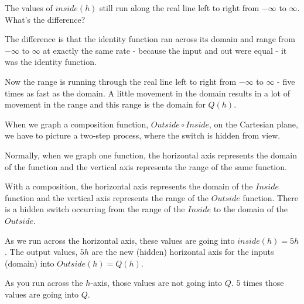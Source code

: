 \documentclass{ximera}
\begin{document}
The values of $inside(h)$ still run along the real line left to right from $-\infty$ to $\infty$. What's the difference?

The difference is that the identity function ran across its domain and range from $-\infty$ to $\infty$ at exactly the same rate - because the input and out were equal - it was the identity function.


Now the range is running through the real line left to right from $-\infty$ to $\infty$ - five times as fast as the domain. A little movement in the domain results in a lot of movement in the range and this range is the domain for $Q(h)$.






\begin{paradox}

When we graph a composition function, $Outside \circ Inside$, on the Cartesian plane, we have to picture a two-step process, where the switch is hidden from view.  

Normally, when we graph one function, the horizontal axis represents the domain of the function and the vertical axis represents the range of the same function.

With a composition, the horizontal axis represents the domain of the $Inside$ function and the vertical axis represents the range of the $Outside$ function.  There is a hidden switch occurring from the range of the $Inside$ to the domain of the $Outside$.

\end{paradox}

As we run across the horizontal axis, these values are going into $inside(h) = 5h$.  The output values, $5h$ are the new (hidden) horizontal axis for the inputs (domain) into $Outside(h) = Q(h)$.

As you run across the $h$-axis, those values are not going into $Q$.  $5$ times those values are going into $Q$.
\end{document}
